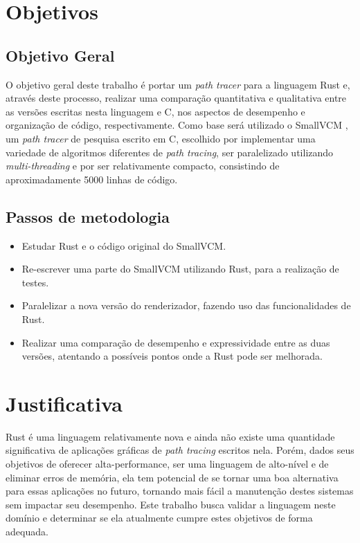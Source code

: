\documentclass[tg]{mdtufsm}
\def\Cpp{{C\nolinebreak[4]\raisebox{.20ex}{\small\bf++}}}
\begin{document}
\section{Objetivos}

\subsection{Objetivo Geral}

O objetivo geral deste trabalho é portar um \emph{path tracer} para a linguagem Rust e, através deste processo,
realizar uma comparação quantitativa e qualitativa entre as versões escritas nesta linguagem e \Cpp, nos aspectos de
desempenho e organização de código, respectivamente. Como base será utilizado o SmallVCM \citep{smallvcm}, um
\emph{path tracer} de pesquisa escrito em \Cpp, escolhido por implementar uma variedade
de algoritmos diferentes de \emph{path tracing}, ser paralelizado utilizando \emph{multi-threading} e por ser relativamente compacto, consistindo de
aproximadamente 5000 linhas de código.

\subsection{Passos de metodologia}
\begin{itemize}
	\item Estudar Rust e o código original do SmallVCM.
	\item Re-escrever uma parte do SmallVCM utilizando Rust, para a realização de
		testes.
	\item Paralelizar a nova versão do renderizador, fazendo uso das funcionalidades de Rust.
	\item Realizar uma comparação de desempenho e expressividade entre as duas versões,
		atentando a possíveis pontos onde a Rust pode ser melhorada.
\end{itemize}

\section{Justificativa}

Rust é uma linguagem relativamente nova e ainda não existe uma quantidade significativa de aplicações gráficas de \emph{path tracing} escritos nela. Porém, dados seus objetivos de oferecer alta-performance, ser uma linguagem de alto-nível e de eliminar erros de memória, ela tem potencial de se tornar uma boa alternativa para essas aplicações no futuro, tornando mais fácil a manutenção destes sistemas sem impactar seu desempenho. Este trabalho busca validar a linguagem neste domínio e determinar se ela atualmente cumpre estes objetivos de forma adequada.
\end{document}

